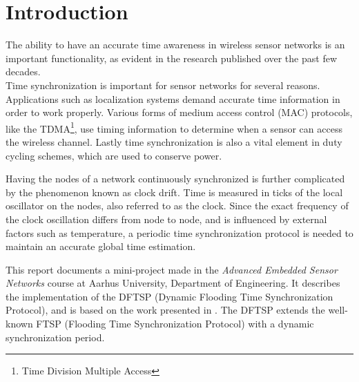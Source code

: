 \documentclass[Main]{subfiles}
\begin{document}
\section*{Introduction} %
\label{sec:introduction}

	The ability to have an accurate time awareness in wireless sensor networks is an important functionality, as evident in the research published over the past few decades\cite{FTSParticle,dynamicFTSParticle,RBSarticle,TPSNarticle}.
	\\Time synchronization is important for sensor networks for several reasons.
	Applications such as localization systems demand accurate time information in order to work properly.
	Various forms of medium access control (MAC) protocols, like the TDMA\footnote{Time Division Multiple Access}, use timing information to determine when a sensor can access the wireless channel.
	Lastly time synchronization is also a vital element in duty cycling schemes, which are used to conserve power.

	Having the nodes of a network continuously synchronized is further complicated by the phenomenon known as clock drift. 
	Time is measured in ticks of the local oscillator on the nodes, also referred to as the clock.
	Since the exact frequency of the clock oscillation differs from node to node, and is influenced by external factors such as temperature, a periodic time synchronization protocol is needed to maintain an accurate global time estimation.

	This report documents a mini-project made in the \emph{Advanced Embedded Sensor Networks} course at Aarhus University, Department of Engineering. 
	It describes the implementation of the DFTSP (Dynamic Flooding Time Synchronization Protocol), and is based on the work presented in \cite{dynamicFTSParticle}. 
	The DFTSP extends the well-known FTSP (Flooding Time Synchronization Protocol)\cite{FTSParticle} with a dynamic synchronization period. 

\end{document}

